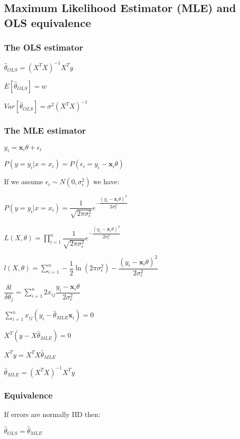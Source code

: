 
\subsection{Maximum Likelihood Estimator (MLE) and OLS equivalence}

\subsubsection{The OLS estimator}

\(\hat \theta_{OLS}=(X^TX)^{-1}X^Ty\)

\(E[\hat \theta_{OLS}]=w\)

\(Var[\hat \theta_{OLS}]=\sigma^2 (X^TX)^{-1}\)

\subsubsection{The MLE estimator}

\(y_i=\mathbf x_i\theta +\epsilon_i \)

\(P(y=y_i|x=x_i)=P(\epsilon_i=y_i-\mathbf x_i \theta )\)

If we assume \(\epsilon_i \sim N(0, \sigma^2_\epsilon )\) we have:

\(P(y=y_i|x=x_i)=\dfrac{1}{\sqrt {2\pi \sigma^2_\epsilon }}e^{-\dfrac{(y_i-\mathbf x_i\theta )^2}{2\sigma_\epsilon^2}}\)

\(L(X, \theta )=\prod_{i=1}^n\dfrac{1}{\sqrt {2\pi \sigma^2_\epsilon }}e^{-\dfrac{(y_i-\mathbf x_i\theta )^2}{2\sigma_\epsilon^2}}\)

\(l(X, \theta )=\sum_{i=1}^n -\dfrac{1}{2}\ln (2\pi \sigma_\epsilon^2)-\dfrac{(y_i-\mathbf x_i\theta )^2}{2\sigma_\epsilon^2}\)

\(\dfrac{\delta l}{\delta \theta_j }=\sum_{i=1}^n2x_{ij}\dfrac{y_i-\mathbf x_{i}\theta }{2\sigma^2_\epsilon}\)

\(\sum_{i=1}^nx_{ij}(y_i-\hat \theta_{MLE}\mathbf x_{i} )=0\)

\(X^T(y-X\hat \theta_{MLE} )=0\)

\(X^Ty=X^TX\hat \theta_{MLE} \)

\(\hat \theta_{MLE}=(X^TX)^{-1}X^Ty\)

\subsubsection{Equivalence}

If errors are normally IID then:

\(\hat \theta_{OLS}=\hat \theta_{MLE}\)

